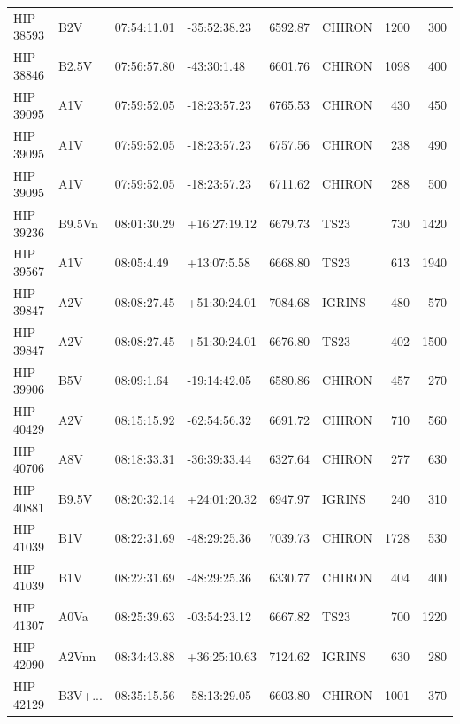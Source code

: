 \documentclass{emulateapj}
\begin{document}
\begin{longtable*}{|l|lllrlrr|}
   HIP 38593 &            B2V &    07:54:11.01 &   -35:52:38.23 &  6592.87 &     CHIRON &     1200 &     300 \\
   HIP 38846 &          B2.5V &    07:56:57.80 &    -43:30:1.48 &  6601.76 &     CHIRON &     1098 &     400 \\
   HIP 39095 &            A1V &    07:59:52.05 &   -18:23:57.23 &  6765.53 &     CHIRON &      430 &     450 \\
   HIP 39095 &            A1V &    07:59:52.05 &   -18:23:57.23 &  6757.56 &     CHIRON &      238 &     490 \\
   HIP 39095 &            A1V &    07:59:52.05 &   -18:23:57.23 &  6711.62 &     CHIRON &      288 &     500 \\
   HIP 39236 &         B9.5Vn &    08:01:30.29 &   +16:27:19.12 &  6679.73 &       TS23 &      730 &    1420 \\
   HIP 39567 &            A1V &     08:05:4.49 &    +13:07:5.58 &  6668.80 &       TS23 &      613 &    1940 \\
   HIP 39847 &            A2V &    08:08:27.45 &   +51:30:24.01 &  7084.68 &     IGRINS &      480 &     570 \\
   HIP 39847 &            A2V &    08:08:27.45 &   +51:30:24.01 &  6676.80 &       TS23 &      402 &    1500 \\
   HIP 39906 &            B5V &     08:09:1.64 &   -19:14:42.05 &  6580.86 &     CHIRON &      457 &     270 \\
   HIP 40429 &            A2V &    08:15:15.92 &   -62:54:56.32 &  6691.72 &     CHIRON &      710 &     560 \\
   HIP 40706 &            A8V &    08:18:33.31 &   -36:39:33.44 &  6327.64 &     CHIRON &      277 &     630 \\
   HIP 40881 &          B9.5V &    08:20:32.14 &   +24:01:20.32 &  6947.97 &     IGRINS &      240 &     310 \\
   HIP 41039 &            B1V &    08:22:31.69 &   -48:29:25.36 &  7039.73 &     CHIRON &     1728 &     530 \\
   HIP 41039 &            B1V &    08:22:31.69 &   -48:29:25.36 &  6330.77 &     CHIRON &      404 &     400 \\
   HIP 41307 &           A0Va &    08:25:39.63 &   -03:54:23.12 &  6667.82 &       TS23 &      700 &    1220 \\
   HIP 42090 &          A2Vnn &    08:34:43.88 &   +36:25:10.63 &  7124.62 &     IGRINS &      630 &     280 \\
   HIP 42129 &        B3V+... &    08:35:15.56 &   -58:13:29.05 &  6603.80 &     CHIRON &     1001 &     370 \\

\end{longtable*}
\end{document}
